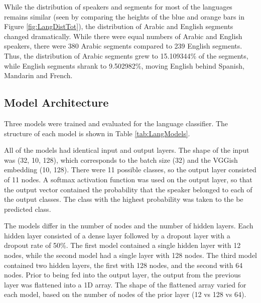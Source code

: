 While the distribution of speakers and segments for most of the languages remains similar (seen by comparing the heights of the blue and orange bars in Figure \ref{fig:LangDistTot}), the distribution of Arabic and English segments changed dramatically. While there were equal numbers of Arabic and English speakers, there were 380 Arabic segments compared to 239 English segments. Thus, the distribution of Arabic segments grew to 15.109344\% of the segments, while English segments shrank to 9.502982\%, moving English behind Spanish, Mandarin and French.

\subsection{Model Architecture}

Three models were trained and evaluated for the language classifier. The structure of each model is shown in Table \ref{tab:LangModels}. 

All of the models had identical input and output layers. The shape of the input was (32, 10, 128), which corresponds to the batch size (32) and the VGGish embedding (10, 128).  There were 11 possible classes, so the output layer consisted of 11 nodes. A softmax activation function was used on the output layer, so that the output vector contained the probability that the speaker belonged to each of the output classes. The class with the highest probability was taken to the be predicted class.

The models differ in the number of nodes and the number of hidden layers. Each hidden layer consisted of a dense layer followed by a dropout layer with a dropout rate of 50\%. The first model contained a single hidden layer with 12 nodes, while the second model had a single layer with 128 nodes. The third model contained two hidden layers, the first with 128 nodes, and the second with 64 nodes. Prior to being fed into the output layer, the output from the previous layer was flattened into a 1D array. The shape of the flattened array varied for each model, based on the number of nodes of the prior layer (12 vs 128 vs 64).

